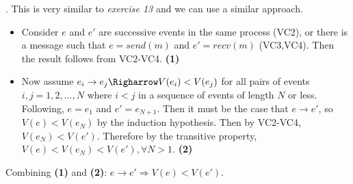 \documentclass[12pt]{article}
\newcounter{question}
\newcommand{\question}[1]{
    \stepcounter{question}
    \thequestion. #1 \hfill
}
\begin{document}
\question{
This is very similar to \textit{exercise 13} and we can use a similar approach.\\

\begin{itemize}
    \item Consider $e$ and $e'$ are successive events in the same process (VC2), or there is a message such that $e = send(m)$ and $e' = recv(m)$ (VC3,VC4). Then the result follows from VC2-VC4. \textbf{(1)}
    \item Now assume $e_i \rightarrow e_j \Righarrow V(e_i) < V(e_j)$ for all pairs of events $i,j =  1,2,...,N$ where $i < j$ in a sequence of events of length $N$ or less. Following, $e = e_1$ and $e' = e_{N+1}$. Then it must be the case that $e \rightarrow e'$, so $V(e) < V(e_N)$ by the induction hypothesis. Then by VC2-VC4, $V(e_N) < V(e')$. Therefore by the transitive property, $V(e) < V(e_N) < V(e'), \forall N > 1$. \textbf{(2)}
\end{itemize}

Combining \textbf{(1)} and \textbf{(2)}: $e \rightarrow e' \Rightarrow V(e) < V(e')$.
}
\end{document}
